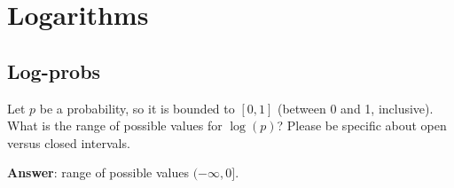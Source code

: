 \documentclass[11pt,letterpaper]{article}
\theoremstyle{definition}
\begin{document}
%
%
%
%

\section{Logarithms}

\subsection{Log-probs}
Let $p$ be a probability, so it is bounded to $[0,1]$ (between 0 and 1, inclusive).
What is the range of possible values for $\log(p)$?  Please be specific about open versus closed intervals.

\textbf{Answer}: range of possible values  $(-\infty , 0]$. 
\end{document}
